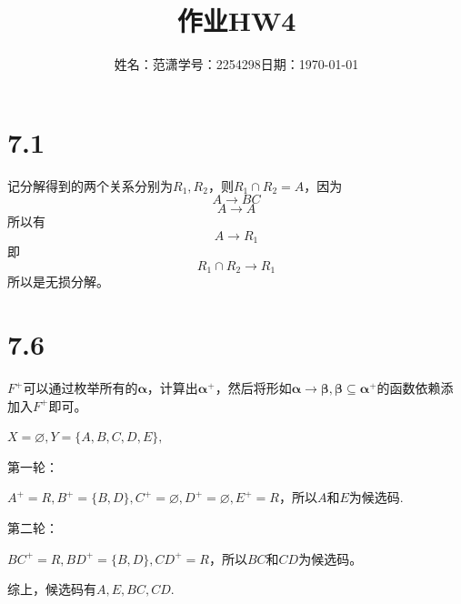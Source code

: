 \documentclass[a4paper]{article}
\title{作业{\hspace{1ex}}HW4}
\author{姓名：范潇{\quad}学号：2254298{\quad}日期：\today}
\date{}
\begin{document}
\maketitle
\section{7.1}
记分解得到的两个关系分别为$R_1,R_2$，则$R_1\cap R_2=A$，因为
\[A\rightarrow BC\]
\[A\rightarrow A\]
所以有
\[A\rightarrow R_1\]
即
\[R_1\cap R_2\rightarrow R_1\]
所以是无损分解。
\section{7.6}
$F^{+}$可以通过枚举所有的$\bm{\alpha}$，计算出$\bm{\alpha}^{+}$，然后将形如$\bm{\alpha}\rightarrow\bm{\beta},\bm{\beta}\subseteq \bm{\alpha}^{+}$的函数依赖添加入$F^+$即可。

$X=\varnothing,Y=\{A,B,C,D,E\},$

第一轮： 

$A^+=R,B^+=\{B,D\},C^+=\varnothing,D^+=\varnothing,E^{+}=R$，所以$A$和$E$为候选码.

第二轮：

$BC^+=R,BD^+=\{B,D\},CD^+=R$，所以$BC$和$CD$为候选码。

综上，候选码有$A,E,BC,CD$.

\end{document}
